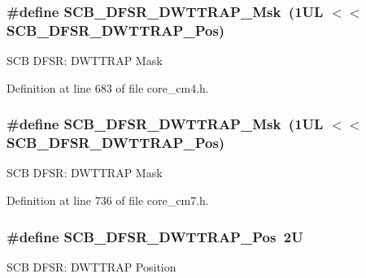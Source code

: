 \subsubsection[{\texorpdfstring{S\+C\+B\+\_\+\+D\+F\+S\+R\+\_\+\+D\+W\+T\+T\+R\+A\+P\+\_\+\+Msk}{SCB_DFSR_DWTTRAP_Msk}}]{\setlength{\rightskip}{0pt plus 5cm}\#define S\+C\+B\+\_\+\+D\+F\+S\+R\+\_\+\+D\+W\+T\+T\+R\+A\+P\+\_\+\+Msk~(1\+U\+L $<$$<$ S\+C\+B\+\_\+\+D\+F\+S\+R\+\_\+\+D\+W\+T\+T\+R\+A\+P\+\_\+\+Pos)}\hypertarget{group___c_m_s_i_s___s_c_b_ga3f7384b8a761704655fd45396a305663}{}\label{group___c_m_s_i_s___s_c_b_ga3f7384b8a761704655fd45396a305663}
S\+CB D\+F\+SR\+: D\+W\+T\+T\+R\+AP Mask 

Definition at line 683 of file core\+\_\+cm4.\+h.

\subsubsection[{\texorpdfstring{S\+C\+B\+\_\+\+D\+F\+S\+R\+\_\+\+D\+W\+T\+T\+R\+A\+P\+\_\+\+Msk}{SCB_DFSR_DWTTRAP_Msk}}]{\setlength{\rightskip}{0pt plus 5cm}\#define S\+C\+B\+\_\+\+D\+F\+S\+R\+\_\+\+D\+W\+T\+T\+R\+A\+P\+\_\+\+Msk~(1\+U\+L $<$$<$ S\+C\+B\+\_\+\+D\+F\+S\+R\+\_\+\+D\+W\+T\+T\+R\+A\+P\+\_\+\+Pos)}\hypertarget{group___c_m_s_i_s___s_c_b_ga3f7384b8a761704655fd45396a305663}{}\label{group___c_m_s_i_s___s_c_b_ga3f7384b8a761704655fd45396a305663}
S\+CB D\+F\+SR\+: D\+W\+T\+T\+R\+AP Mask 

Definition at line 736 of file core\+\_\+cm7.\+h.

\subsubsection[{\texorpdfstring{S\+C\+B\+\_\+\+D\+F\+S\+R\+\_\+\+D\+W\+T\+T\+R\+A\+P\+\_\+\+Pos}{SCB_DFSR_DWTTRAP_Pos}}]{\setlength{\rightskip}{0pt plus 5cm}\#define S\+C\+B\+\_\+\+D\+F\+S\+R\+\_\+\+D\+W\+T\+T\+R\+A\+P\+\_\+\+Pos~2U}\hypertarget{group___c_m_s_i_s___s_c_b_gaccf82364c6d0ed7206f1084277b7cc61}{}\label{group___c_m_s_i_s___s_c_b_gaccf82364c6d0ed7206f1084277b7cc61}
S\+CB D\+F\+SR\+: D\+W\+T\+T\+R\+AP Position 


